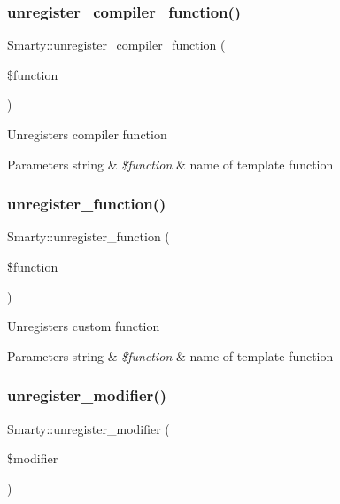 \subsubsection{\texorpdfstring{unregister\+\_\+compiler\+\_\+function()}{unregister\_compiler\_function()}}
{\footnotesize\ttfamily Smarty\+::unregister\+\_\+compiler\+\_\+function (\begin{DoxyParamCaption}\item[{}]{\$function }\end{DoxyParamCaption})}

Unregisters compiler function


\begin{DoxyParams}[1]{Parameters}
string & {\em \$function} & name of template function \\
\hline
\end{DoxyParams}
\mbox{\label{class_smarty_a391eb12cf1524df705a3005413ce2265}} 
\subsubsection{\texorpdfstring{unregister\+\_\+function()}{unregister\_function()}}
{\footnotesize\ttfamily Smarty\+::unregister\+\_\+function (\begin{DoxyParamCaption}\item[{}]{\$function }\end{DoxyParamCaption})}

Unregisters custom function


\begin{DoxyParams}[1]{Parameters}
string & {\em \$function} & name of template function \\
\hline
\end{DoxyParams}
\mbox{\label{class_smarty_a6240087cdda905b9f71594fe79c352bc}} 
\subsubsection{\texorpdfstring{unregister\+\_\+modifier()}{unregister\_modifier()}}
{\footnotesize\ttfamily Smarty\+::unregister\+\_\+modifier (\begin{DoxyParamCaption}\item[{}]{\$modifier }\end{DoxyParamCaption})}

